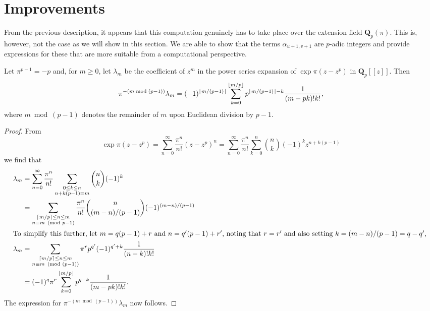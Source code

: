 \section{Improvements}

From the previous description, it appears that this computation 
genuinely has to take place over the extension field 
$\mathbf{Q}_p(\pi)$.  This is, however, not the case as we 
will show in this section.  We are able to show that the terms 
$\alpha_{u+1,v+1}$ are $p$-adic integers and provide expressions 
for these that are more suitable from a computational perspective.  

\begin{lem} \label{lem:lambdam}
Let $\pi^{p-1} = -p$ and, for $m \geq 0$, let $\lambda_m$ 
be the coefficient of $z^m$ in the power series expansion 
of $\exp \pi (z - z^p)$ in $\mathbf{Q}_p[[z]]$.  Then 
\begin{equation*}
\pi^{- (m \bmod{(p-1)})} \lambda_m = (-1)^{\left\lfloor m/(p-1)\right\rfloor} \sum_{k=0}^{\left\lfloor m/p\right\rfloor} p^{\left\lfloor m/(p-1)\right\rfloor - k} \frac{1}{(m-pk)! k!},
\end{equation*}
where $m \bmod{(p-1)}$ denotes the remainder of $m$ upon Euclidean 
division by $p-1$.
\end{lem}

\begin{proof}
From
\begin{equation*}
\exp \pi (z - z^p) = \sum_{n=0}^{\infty} \frac{\pi^n}{n!} (z - z^p) ^n
                   = \sum_{n=0}^{\infty} \frac{\pi^n}{n!} \sum_{k=0}^n \binom{n}{k} (-1)^k z^{n + k(p-1)}
\end{equation*}
we find that 
\begin{align*}
\lambda_m & = \sum_{n = 0}^{\infty} \frac{\pi^n}{n!} \sum_{\substack{0 \leq k \leq n\\n + k(p-1) = m}} \binom{n}{k} (-1)^k \\
          & = \sum_{\substack{\left\lceil m/p\right\rceil \leq n \leq m\\ n \equiv m \pmod{p-1}}} \frac{\pi^n}{n!} \binom{n}{(m-n)/(p-1)} (-1)^{(m-n)/(p-1)} \\
\intertext{To simplify this further, let $m = q(p-1) + r$ and 
$n = q'(p-1) + r'$, noting that $r = r'$ and also setting 
$k = (m-n)/(p-1) = q - q'$, }
\lambda_m & = \sum_{\substack{\left\lceil m/p\right\rceil \leq n \leq m\\ n \equiv m \pmod{(p-1)}}} \pi^r p^{q'} (-1)^{q' + k} \frac{1}{(n-k)! k!} \\
          & = (-1)^q \pi^r \sum_{k=0}^{\left\lfloor m/p\right\rfloor} p^{q - k} \frac{1}{(m - pk)!k!}.
\end{align*}
The expression for $\pi^{-(m \bmod{(p-1)})} \lambda_m$ now follows.
\end{proof}

